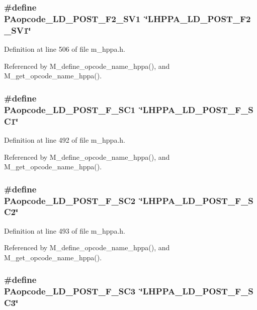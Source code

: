 \subsubsection{\setlength{\rightskip}{0pt plus 5cm}\#define PAopcode\_\-LD\_\-POST\_\-F2\_\-SV1~\char`\"{}LHPPA\_\-LD\_\-POST\_\-F2\_\-SV1\char`\"{}}\label{m__hppa_8h_299fa409d974f01d3810df254c1a51d7}




Definition at line 506 of file m\_\-hppa.h.

Referenced by M\_\-define\_\-opcode\_\-name\_\-hppa(), and M\_\-get\_\-opcode\_\-name\_\-hppa().
\subsubsection{\setlength{\rightskip}{0pt plus 5cm}\#define PAopcode\_\-LD\_\-POST\_\-F\_\-SC1~\char`\"{}LHPPA\_\-LD\_\-POST\_\-F\_\-SC1\char`\"{}}\label{m__hppa_8h_a54207633f14384c12842beb3758af24}




Definition at line 492 of file m\_\-hppa.h.

Referenced by M\_\-define\_\-opcode\_\-name\_\-hppa(), and M\_\-get\_\-opcode\_\-name\_\-hppa().
\subsubsection{\setlength{\rightskip}{0pt plus 5cm}\#define PAopcode\_\-LD\_\-POST\_\-F\_\-SC2~\char`\"{}LHPPA\_\-LD\_\-POST\_\-F\_\-SC2\char`\"{}}\label{m__hppa_8h_fd8f4df40e7764872ca0d353a707824a}




Definition at line 493 of file m\_\-hppa.h.

Referenced by M\_\-define\_\-opcode\_\-name\_\-hppa(), and M\_\-get\_\-opcode\_\-name\_\-hppa().
\subsubsection{\setlength{\rightskip}{0pt plus 5cm}\#define PAopcode\_\-LD\_\-POST\_\-F\_\-SC3~\char`\"{}LHPPA\_\-LD\_\-POST\_\-F\_\-SC3\char`\"{}}\label{m__hppa_8h_492c0178451b0bf4e13c80388b9c26ad}




